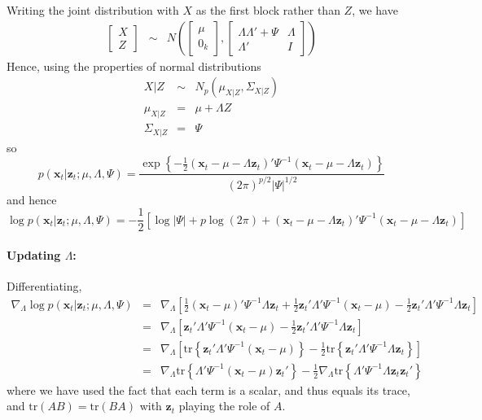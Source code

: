 \documentclass[12pt]{article}
\theoremstyle{definition}
\begin{document}
Writing the joint distribution with $X$ as the first block rather than $Z$, we have
	\begin{eqnarray*}
		\left[\begin{array}{c}
			X\\ Z
		\end{array}\right] 
		&\sim&  N\left(
		\left[\begin{array}{c}
			 \mu \\ 0_k 
	\end{array}\right], 
		\left[\begin{array}{cc}
			 \Lambda \Lambda' + \Psi & \Lambda\\
			 \Lambda' & I
		\end{array} \right] \right)
	\end{eqnarray*}
Hence, using the properties of normal distributions
	\begin{eqnarray*}
		X | Z &\sim& N_p(\mu_{X|Z}, \Sigma_{X|Z})\\
		\mu_{X|Z} &=& \mu + \Lambda Z \\
		\Sigma_{X|Z} &=& \Psi
	\end{eqnarray*}
so 
	$$p(\textbf{x}_t| \textbf{z}_t;\mu, \Lambda, \Psi) = \frac{\exp \left\{-\frac{1}{2}(\mathbf{x}_t - \mu -  \Lambda \textbf{z}_t)' \Psi^{-1} (\mathbf{x}_t - \mu -  \Lambda \textbf{z}_t) \right\}}{{(2\pi)^{p/2}\left|\Psi \right|^{1/2}}}$$
and hence
	$$\log p(\textbf{x}_t| \textbf{z}_t;\mu, \Lambda, \Psi) = -\frac{1}{2}\left[  \log |\Psi| + p \log(2\pi) +(\mathbf{x}_t - \mu -  \Lambda \textbf{z}_t)' \Psi^{-1} (\mathbf{x}_t - \mu -  \Lambda \textbf{z}_t)\right] $$


\paragraph{Updating $\Lambda$:}
Differentiating, 
	\begin{eqnarray*}
		\nabla_\Lambda \log p(\textbf{x}_t| \textbf{z}_t;\mu, \Lambda, \Psi) &=&  \nabla_\Lambda \left[ \frac{1}{2}(\mathbf{x}_t - \mu)' \Psi^{-1} \Lambda \mathbf{z}_t + \frac{1}{2} \mathbf{z}_t' \Lambda'\Psi^{-1} (\mathbf{x}_t - \mu)- \frac{1}{2} \mathbf{z}_t' \Lambda' \Psi^{-1} \Lambda \mathbf{z}_t \right] \\
		&=& \nabla_\Lambda \left[  \mathbf{z}_t' \Lambda'\Psi^{-1} (\mathbf{x}_t - \mu)- \frac{1}{2} \mathbf{z}_t' \Lambda' \Psi^{-1} \Lambda \mathbf{z}_t \right]\\
		&=& \nabla_\Lambda \left[  \mbox{tr}\left\{\mathbf{z}_t' \Lambda'\Psi^{-1} (\mathbf{x}_t - \mu)\right\}- \frac{1}{2} \mbox{tr}\left\{ \mathbf{z}_t' \Lambda' \Psi^{-1} \Lambda \mathbf{z}_t \right\}\right]\\
		&=& \nabla_\Lambda \mbox{tr}\left\{ \Lambda'\Psi^{-1} (\mathbf{x}_t - \mu)\mathbf{z}_t'\right\}- \frac{1}{2} \nabla_\Lambda \mbox{tr}\left\{  \Lambda' \Psi^{-1} \Lambda \mathbf{z}_t \mathbf{z}_t'\right\}
	\end{eqnarray*}
where we have used the fact that each term is a scalar, and thus equals its trace, and $\mbox{tr}(AB) = \mbox{tr}(BA)$ with $\mathbf{z}_t$ playing the role of $A$.
\end{document}
